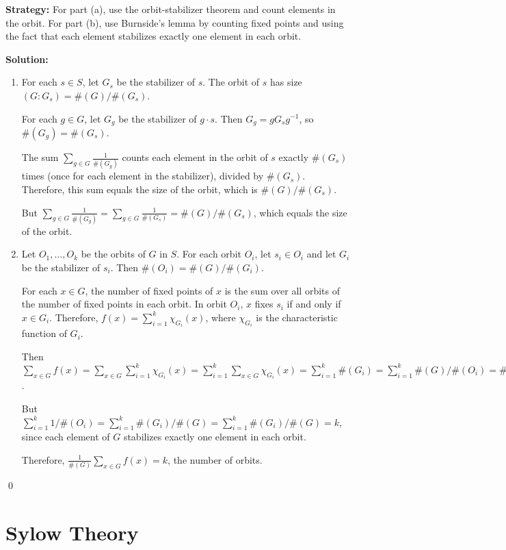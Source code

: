 \noindent\textbf{Strategy:} For part (a), use the orbit-stabilizer theorem and count elements in the orbit. For part (b), use Burnside's lemma by counting fixed points and using the fact that each element stabilizes exactly one element in each orbit.

\noindent\textbf{Solution:}
\begin{enumerate}[label=(\alph*)]
\item For each $s \in S$, let $G_s$ be the stabilizer of $s$. The orbit of $s$ has size $(G : G_s) = \#(G)/\#(G_s)$. 

For each $g \in G$, let $G_g$ be the stabilizer of $g \cdot s$. Then $G_g = gG_sg^{-1}$, so $\#(G_g) = \#(G_s)$. 

The sum $\sum_{g \in G} \frac{1}{\#(G_g)}$ counts each element in the orbit of $s$ exactly $\#(G_s)$ times (once for each element in the stabilizer), divided by $\#(G_s)$. Therefore, this sum equals the size of the orbit, which is $\#(G)/\#(G_s)$.

But $\sum_{g \in G} \frac{1}{\#(G_g)} = \sum_{g \in G} \frac{1}{\#(G_s)} = \#(G)/\#(G_s)$, which equals the size of the orbit.

\item Let $O_1, \ldots, O_k$ be the orbits of $G$ in $S$. For each orbit $O_i$, let $s_i \in O_i$ and let $G_i$ be the stabilizer of $s_i$. Then $\#(O_i) = \#(G)/\#(G_i)$.

For each $x \in G$, the number of fixed points of $x$ is the sum over all orbits of the number of fixed points in each orbit. In orbit $O_i$, $x$ fixes $s_i$ if and only if $x \in G_i$. Therefore, $f(x) = \sum_{i=1}^k \chi_{G_i}(x)$, where $\chi_{G_i}$ is the characteristic function of $G_i$.

Then $\sum_{x \in G} f(x) = \sum_{x \in G} \sum_{i=1}^k \chi_{G_i}(x) = \sum_{i=1}^k \sum_{x \in G} \chi_{G_i}(x) = \sum_{i=1}^k \#(G_i) = \sum_{i=1}^k \#(G)/\#(O_i) = \#(G) \sum_{i=1}^k 1/\#(O_i)$.

But $\sum_{i=1}^k 1/\#(O_i) = \sum_{i=1}^k \#(G_i)/\#(G) = \sum_{i=1}^k \#(G_i)/\#(G) = k$, since each element of $G$ stabilizes exactly one element in each orbit.

Therefore, $\frac{1}{\#(G)} \sum_{x \in G} f(x) = k$, the number of orbits.
\end{enumerate}


\qed
\section{Sylow Theory}

